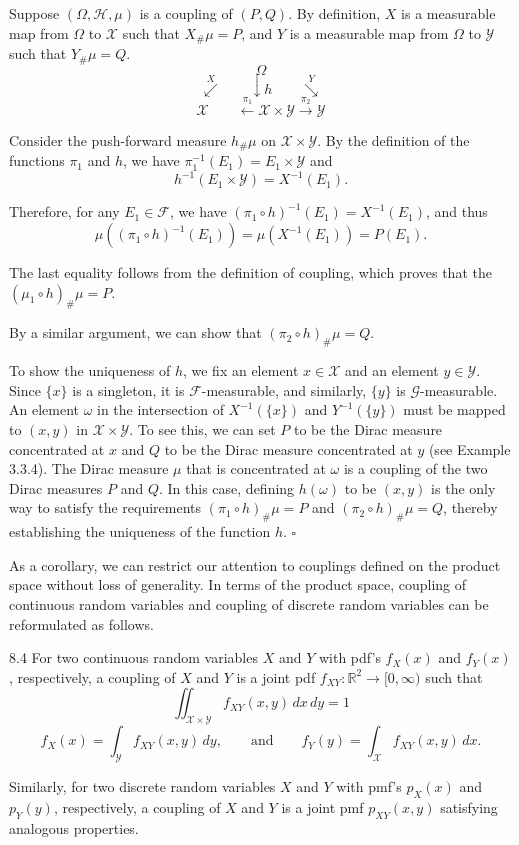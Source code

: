 Suppose $(\Omega,\mathcal{H},\mu)$ is a coupling of $(P,Q)$. By definition, $X$ is a measurable map from $\Omega$ to $\mathcal{X}$ such that $X_{\#}\mu=P$, and $Y$ is a measurable map from $\Omega$ to $\mathcal{Y}$ such that $Y_{\#}\mu=Q$.
\[
\Omega
\]
\[
\overset{X}{\swarrow} \qquad \downarrow h \qquad \overset{Y}{\searrow}
\]
\[
\mathcal{X} \qquad \xleftarrow{\pi_1} \mathcal{X}\times \mathcal{Y} \xrightarrow{\pi_2} \mathcal{Y}
\]

Consider the push-forward measure $h_{\#}\mu$ on $\mathcal{X}\times \mathcal{Y}$. By the definition of the functions $\pi_1$ and $h$, we have $\pi_1^{-1}(E_1)=E_1\times \mathcal{Y}$ and
\[
h^{-1}(E_1\times \mathcal{Y})=X^{-1}(E_1).
\]

Therefore, for any $E_1\in \mathcal{F}$, we have $(\pi_1\circ h)^{-1}(E_1)=X^{-1}(E_1)$, and thus
\[
\mu((\pi_1\circ h)^{-1}(E_1))=\mu(X^{-1}(E_1))=P(E_1).
\]

The last equality follows from the definition of coupling, which proves that the $(\mu_1\circ h)_{\#}\mu=P$.

By a similar argument, we can show that $(\pi_2\circ h)_{\#}\mu=Q$.

To show the uniqueness of $h$, we fix an element $x\in \mathcal{X}$ and an element $y\in \mathcal{Y}$. Since $\{x\}$ is a singleton, it is $\mathcal{F}$-measurable, and similarly, $\{y\}$ is $\mathcal{G}$-measurable. An element $\omega$ in the intersection of $X^{-1}(\{x\})$ and $Y^{-1}(\{y\})$ must be mapped to $(x,y)$ in $\mathcal{X}\times \mathcal{Y}$. To see this, we can set $P$ to be the Dirac measure concentrated at $x$ and $Q$ to be the Dirac measure concentrated at $y$ (see Example 3.3.4). The Dirac measure $\mu$ that is concentrated at $\omega$ is a coupling of the two Dirac measures $P$ and $Q$. In this case, defining $h(\omega)$ to be $(x,y)$ is the only way to satisfy the requirements $(\pi_1\circ h)_{\#}\mu=P$ and $(\pi_2\circ h)_{\#}\mu=Q$, thereby establishing the uniqueness of the function $h$. \hfill $\square$

As a corollary, we can restrict our attention to couplings defined on the product space without loss of generality. In terms of the product space, coupling of continuous random variables and coupling of discrete random variables can be reformulated as follows.

\begin{defbox}{8.4}
For two continuous random variables $X$ and $Y$ with pdf's $f_X(x)$ and $f_Y(x)$, respectively, a coupling of $X$ and $Y$ is a joint pdf $f_{XY}:\mathbb{R}^2\to [0,\infty)$ such that
\[
\iint_{\mathcal{X}\times \mathcal{Y}} f_{XY}(x,y)\, dx\, dy = 1
\]
\[
f_X(x)=\int_{\mathcal{Y}} f_{XY}(x,y)\, dy,
\qquad \text{and} \qquad
f_Y(y)=\int_{\mathcal{X}} f_{XY}(x,y)\, dx.
\]

Similarly, for two discrete random variables $X$ and $Y$ with pmf's $p_X(x)$ and $p_Y(y)$, respectively, a coupling of $X$ and $Y$ is a joint pmf $p_{XY}(x,y)$ satisfying analogous properties.
\end{defbox}
